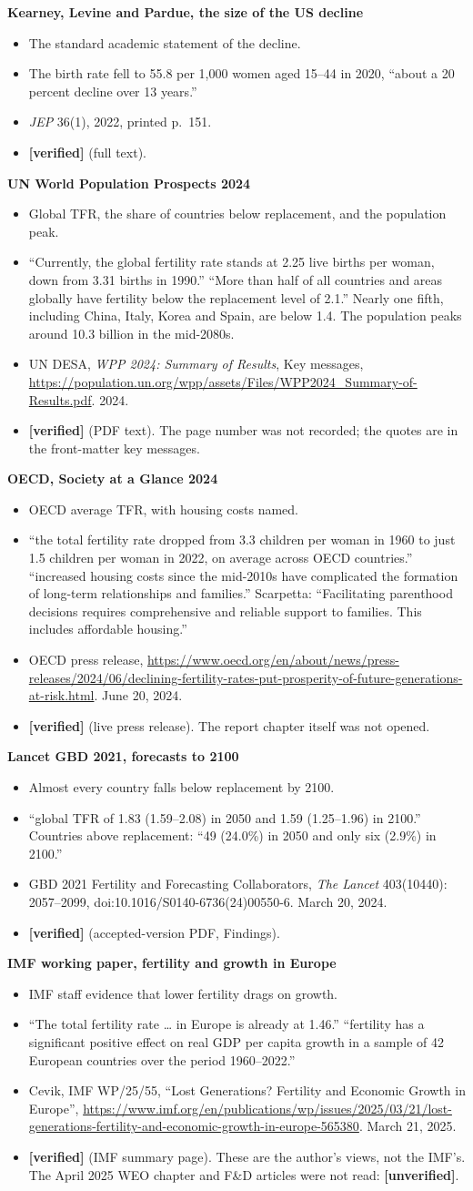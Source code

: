 \documentclass[10pt]{article}
\newcommand{\ok}{\textcolor{green!45!black}{\textbf{[verified]}}}
\newcommand{\unv}{\textcolor{red!70!black}{\textbf{[unverified]}}}
\newcommand{\entry}[5]{%
  \textbf{#1}\par
  \begin{itemize}
    \item #2
    \item #3
    \item #4
    \item #5
  \end{itemize}}
\begin{document}
\entry{Kearney, Levine and Pardue, the size of the US decline}
{The standard academic statement of the decline.}
{The birth rate fell to 55.8 per 1,000 women aged 15--44 in 2020, ``about a 20 percent decline over 13 years.''}
{\emph{JEP} 36(1), 2022, printed p.~151.}
{\ok{} (full text).}

\entry{UN World Population Prospects 2024}
{Global TFR, the share of countries below replacement, and the population peak.}
{``Currently, the global fertility rate stands at 2.25 live births per woman, down from 3.31 births in 1990.'' ``More than half of all countries and areas globally have fertility below the replacement level of 2.1.'' Nearly one fifth, including China, Italy, Korea and Spain, are below 1.4. The population peaks around 10.3 billion in the mid-2080s.}
{UN DESA, \emph{WPP 2024: Summary of Results}, Key messages, \url{https://population.un.org/wpp/assets/Files/WPP2024_Summary-of-Results.pdf}. 2024.}
{\ok{} (PDF text). The page number was not recorded; the quotes are in the front-matter key messages.}

\entry{OECD, Society at a Glance 2024}
{OECD average TFR, with housing costs named.}
{``the total fertility rate dropped from 3.3 children per woman in 1960 to just 1.5 children per woman in 2022, on average across OECD countries.'' ``increased housing costs since the mid-2010s have complicated the formation of long-term relationships and families.'' Scarpetta: ``Facilitating parenthood decisions requires comprehensive and reliable support to families. This includes affordable housing.''}
{OECD press release, \url{https://www.oecd.org/en/about/news/press-releases/2024/06/declining-fertility-rates-put-prosperity-of-future-generations-at-risk.html}. June 20, 2024.}
{\ok{} (live press release). The report chapter itself was not opened.}

\entry{Lancet GBD 2021, forecasts to 2100}
{Almost every country falls below replacement by 2100.}
{``global TFR of 1.83 (1.59--2.08) in 2050 and 1.59 (1.25--1.96) in 2100.'' Countries above replacement: ``49 (24.0\%) in 2050 and only six (2.9\%) in 2100.''}
{GBD 2021 Fertility and Forecasting Collaborators, \emph{The Lancet} 403(10440): 2057--2099, doi:10.1016/S0140-6736(24)00550-6. March 20, 2024.}
{\ok{} (accepted-version PDF, Findings).}

\entry{IMF working paper, fertility and growth in Europe}
{IMF staff evidence that lower fertility drags on growth.}
{``The total fertility rate \ldots{} in Europe is already at 1.46.'' ``fertility has a significant positive effect on real GDP per capita growth in a sample of 42 European countries over the period 1960--2022.''}
{Cevik, IMF WP/25/55, ``Lost Generations? Fertility and Economic Growth in Europe'', \url{https://www.imf.org/en/publications/wp/issues/2025/03/21/lost-generations-fertility-and-economic-growth-in-europe-565380}. March 21, 2025.}
{\ok{} (IMF summary page). These are the author's views, not the IMF's. The April 2025 WEO chapter and F\&D articles were not read: \unv.}
\end{document}
